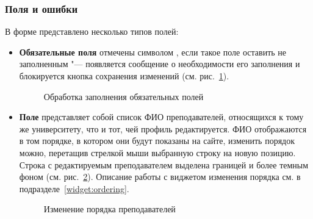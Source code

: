 \subsubsection{Поля и ошибки}
	В форме представлено несколько типов полей:
	\begin{itemize}
		\item \textbf{Обязательные поля} отмечены символом \quotes{*}, если такое поле оставить не заполненным "--- появляется сообщение о необходимости его заполнения и блокируется кнопка сохранения изменений (см. рис.~\ref{instructor:edit_required}).
		
		\begin{figure}[H]
		\caption{Обработка заполнения обязательных полей}
		\label{instructor:edit_required}
		\end{figure}	
		
		\item \textbf{Поле } представляет собой список ФИО преподавателей, относящихся к тому же университету, что и тот, чей профиль редактируется. ФИО отображаются в том порядке, в котором они будут показаны на сайте, изменить порядок можно, перетащив стрелкой мыши выбранную строку на новую позицию. Строка с редактируемым преподавателем выделена границей и более темным фоном (см. рис.~\ref{instructor:edit_instructors}). Описание работы с виджетом изменения порядка см. в подразделе~\ref{widget:ordering}.
		
		\begin{figure}[H]
		\caption{Изменение порядка преподавателей}
		\label{instructor:edit_instructors}
		\end{figure}	
		

\end{itemize}
